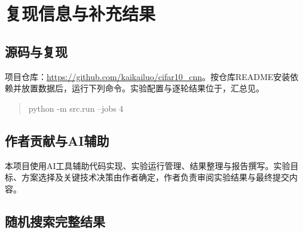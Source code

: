 \section{复现信息与补充结果}
\subsection{源码与复现}
项目仓库：\url{https://github.com/kaikailuo/cifar10_cnn}。按仓库README安装依赖并放置数据后，运行下列命令。实验配置与逐轮结果位于，汇总见。
\begin{quote}\small\ttfamily
python -m src.run --jobs 4
\end{quote}

\subsection{作者贡献与AI辅助}
本项目使用AI工具辅助代码实现、实验运行管理、结果整理与报告撰写。实验目标、方案选择及关键技术决策由作者确定，作者负责审阅实验结果与最终提交内容。

\subsection{随机搜索完整结果}
\begin{center}\footnotesize\linespread{1}\selectfont
\renewcommand{\arraystretch}{1.05}
\captionsetup{type=table}
\caption{24组随机搜索末轮验证结果（种子0，15轮），按验证准确率排序。}\label{tab:search}
\end{center}
